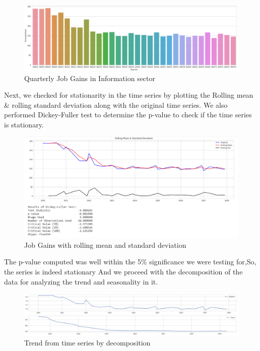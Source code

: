 \documentclass[11pt,letterpaper]{article}
\begin{document}
\begin{figure}[h]
	\includegraphics[width=\linewidth]{"./pictures/jobgains"}
	\caption{Quarterly Job Gains in Information sector}
    \label{fig:Job Gains in Information sector}
\end{figure}

Next, we checked for stationarity in the time series by plotting the Rolling mean \& rolling standard deviation along with the original time series. We also performed Dickey-Fuller test to determine the p-value to check if the time series is stationary.

\begin{figure}[h]
	\includegraphics[width=\linewidth]{"./pictures/DF"}
	\caption{Job Gains with rolling mean and standard deviation}
    \label{fig:Dickey-Fuller on Job gains}
\end{figure}

The p-value computed was well within the 5\% significance we were testing for,So, the series is indeed stationary And we proceed with the decomposition of the data for analyzing the trend and seasonality in it.

\begin{figure}[h]
	\includegraphics[width=\linewidth]{"./pictures/trend"}
	\caption{Trend from time series by decomposition}
    \label{fig:Trend in job gains}
\end{figure}
\end{document}
